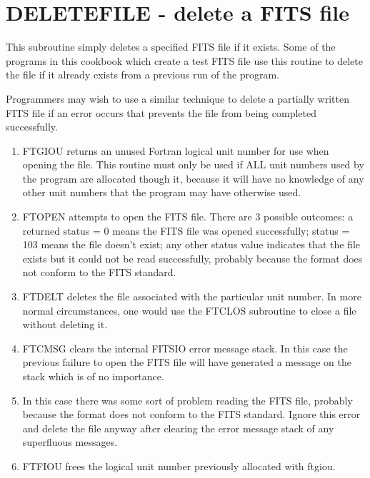\section{DELETEFILE - delete a FITS file}

This subroutine simply deletes a specified FITS file if it exists.
Some of the programs in this cookbook which create a test FITS file use
this routine to delete the file if it already exists from a previous
run of the program.  

Programmers may wish to use a similar technique to delete a
partially written FITS file if an error occurs that prevents the
file from being completed successfully.

\begin{enumerate}
\item
FTGIOU returns an unused Fortran logical unit number for use when
opening the file.  This routine must only be used if ALL unit numbers
used by the program are allocated though it, because it will have no
knowledge of any other unit numbers that the program may have
otherwise used.

\item
FTOPEN attempts to open the FITS file.  There are 3 possible outcomes:
a returned status = 0 means the FITS file was opened successfully;
status = 103 means the file doesn't exist; any other status value
indicates that the file exists but it could not be read successfully,
probably because the format does not conform to the FITS standard.

\item
FTDELT deletes the file associated with the particular unit number.  In
more normal circumstances, one would use the FTCLOS subroutine to close
a file without deleting it.

\item
FTCMSG clears the internal FITSIO error message stack.  In this case
the previous failure to open the FITS file will have generated
a message on the stack which is of no importance.

\item
In this case there was some sort of problem reading the FITS file,
probably because the format does not conform to the FITS standard.
Ignore this error and delete the file anyway after clearing the
error message stack of any superfluous messages.

\item
FTFIOU frees the logical unit number previously allocated with ftgiou.

\end{enumerate}

